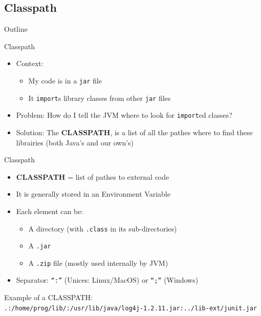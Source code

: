 \documentclass[English,c,%
hyperref={%
    pdftitle={FISA-DE2 OOP in Java},%
    pdfauthor={Muller, Gravier, Laforest, Subercaze},%
    pdfsubject={OOP in Java},%
    pdfkeywords={OOP, Java},%
    colorlinks=true,%
    urlcolor=blue,%
    linkcolor=%
    },%
xcolor={pdftex,svgnames} %
]{beamer}
\begin{document}
\subsection{Classpath}
   \begin{frame}{Outline}
       \tableofcontents[currentsubsection]
   \end{frame}

\begin{frame}{Classpath}
  \begin{itemize}
    \item Context:
    \begin{itemize}
      \item My code is in a \texttt{jar} file
      \item It \lstinline{import}s library classes from other \texttt{jar} files
    \end{itemize}
    \medskip
    \item Problem: How do I tell the JVM where to look for \lstinline{import}ed classes?
    \pause
    \bigskip
    \item Solution: The \textbf{CLASSPATH}, is a list of all the pathes where to find these librairies (both Java's and our own's)
  \end{itemize}
\end{frame}


\begin{frame}{Classpath}
  \begin{itemize}
    \item \textbf{CLASSPATH} = list of pathes to external code
\medskip
    \item It is generally stored in an Environment Variable
    \item Each element can be:
    \begin{itemize}
      \item A directory (with \texttt{.class} in its sub-directories)
      \item A \texttt{.jar}
      \item A \texttt{.zip} file (mostly used internally by JVM)
    \end{itemize}
    \item Separator: \texttt{``:''} (Unices: Linux/MacOS) or \texttt{``;''} (Windows)
\end{itemize}
\bigskip
Example of a CLASSPATH:\\
{\footnotesize \texttt{.:/home/prog/lib/:/usr/lib/java/log4j-1.2.11.jar:../lib-ext/junit.jar}}
\end{frame}
\end{document}
